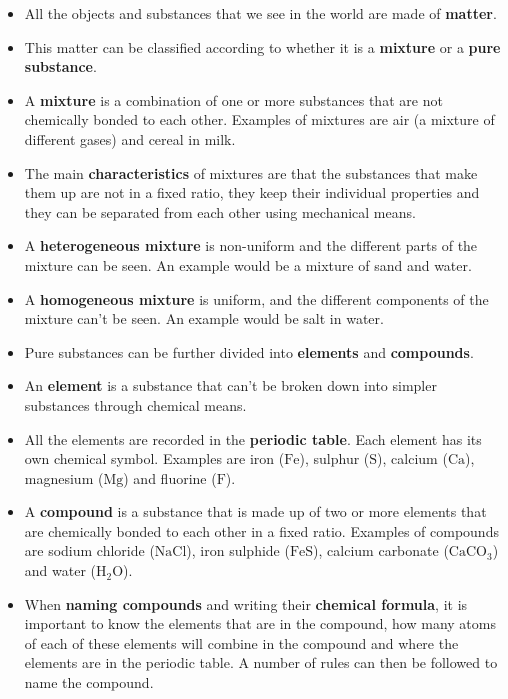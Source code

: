       \label{m38706*id67458}\begin{itemize}[noitemsep]
            \label{m38706*uid114}\item All the objects and substances that we see in the world are made of \textbf{matter}.
\label{m38706*uid115}\item This matter can be classified according to whether it is a \textbf{mixture} or a \textbf{pure substance}.
\label{m38706*uid116}\item A \textbf{mixture} is a combination of one or more substances that are not chemically bonded to each other. Examples of mixtures are air (a mixture of different gases) and cereal in milk.
\label{m38706*uid117}\item The main \textbf{characteristics} of mixtures are that the substances that make them up are not in a fixed ratio, they keep their individual properties and they can be separated from each other using mechanical means.
\label{m38706*uid118}\item A \textbf{heterogeneous mixture} is non-uniform and the different parts of the mixture can be seen. An example would be a mixture of sand and water.
\label{m38706*uid119}\item A \textbf{homogeneous mixture} is uniform, and the different components of the mixture can't be seen. An example would be salt in water.
\label{m38706*uid121}\item Pure substances can be further divided into \textbf{elements} and \textbf{compounds}.
\label{m38706*uid122}\item An \textbf{element} is a substance that can't be broken down into simpler substances through chemical means.
\label{m38706*uid123}\item All the elements are recorded in the \textbf{periodic table}. Each element has its own chemical symbol. Examples are iron ($\text{Fe}$), sulphur ($\text{S}$), calcium ($\text{Ca}$), magnesium ($\text{Mg}$) and fluorine ($\text{F}$).
\label{m38706*uid124}\item A \textbf{compound} is a substance that is made up of two or more elements that are chemically bonded to each other in a fixed ratio. Examples of compounds are sodium chloride ($\text{NaCl}$), iron sulphide ($\text{FeS}$), calcium carbonate (${\text{CaCO}}_{3}$) and water (${\text{H}}_{2}\text{O}$).
\label{m38706*uid125}\item When \textbf{naming compounds} and writing their \textbf{chemical formula}, it is important to know the elements that are in the compound, how many atoms of each of these elements will combine in the compound and where the elements are in the periodic table. A number of rules can then be followed to name the compound.

\end{itemize}
